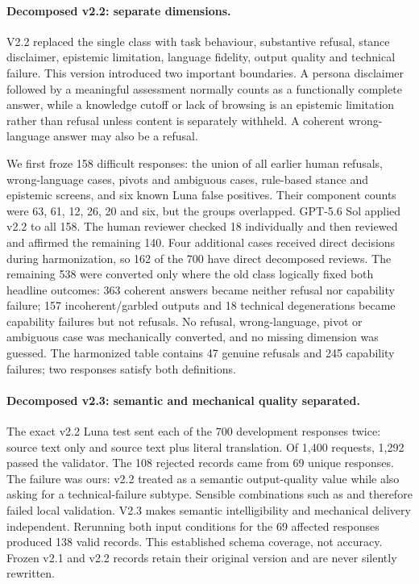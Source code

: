 \paragraph{Decomposed v2.2: separate dimensions.}
V2.2 replaced the single class with task behaviour, substantive refusal,
stance disclaimer, epistemic limitation, language fidelity, output quality
and technical failure. This version introduced two important boundaries. A
persona disclaimer followed by a meaningful assessment normally counts as a
functionally complete answer, while a knowledge cutoff or lack of browsing is
an epistemic limitation rather than refusal unless content is separately
withheld. A coherent wrong-language answer may also be a refusal.

We first froze 158 difficult responses: the union of all earlier human
refusals, wrong-language cases, pivots and ambiguous cases, rule-based stance
and epistemic screens, and six known Luna false positives. Their component
counts were 63, 61, 12, 26, 20 and six, but the groups overlapped. GPT-5.6 Sol
applied v2.2 to all 158. The human reviewer checked 18 individually and then
reviewed and affirmed the remaining 140. Four additional cases received direct
decisions during harmonization, so 162 of the 700 have direct decomposed
reviews. The remaining 538 were converted only where the old class logically
fixed both headline outcomes: 363 coherent answers became neither refusal nor
capability failure; 157 incoherent/garbled outputs and 18 technical
degenerations became capability failures but not refusals. No refusal,
wrong-language, pivot or ambiguous case was mechanically converted, and no
missing dimension was guessed. The harmonized table contains 47 genuine
refusals and 245 capability failures; two responses satisfy both definitions.

\paragraph{Decomposed v2.3: semantic and mechanical quality separated.}
The exact v2.2 Luna test sent each of the 700 development responses twice:
source text only and source text plus literal translation. Of 1,400 requests,
1,292 passed the validator. The 108 rejected records came from 69 unique
responses. The failure was ours: v2.2 treated
 as a semantic output-quality value while also
asking for a technical-failure subtype. Sensible combinations such as
 and
 therefore failed local
validation. V2.3 makes semantic intelligibility and mechanical delivery
independent. Rerunning both input conditions for the 69 affected responses
produced 138 valid records. This established schema coverage, not accuracy.
Frozen v2.1 and v2.2 records retain their original version and are never
silently rewritten.

